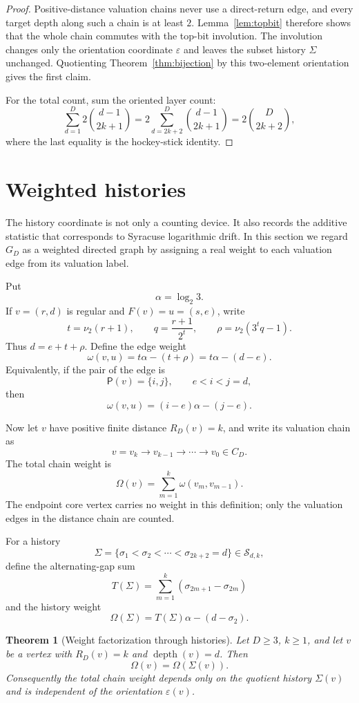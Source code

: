 \documentclass[11pt]{amsart}
\newtheorem{theorem}{Theorem}[section]
\theoremstyle{definition}
\theoremstyle{remark}
\newcommand{\nuu}{\nu_2}
\newcommand{\depth}{\operatorname{depth}}
\newcommand{\Pair}{\mathsf P}
\newcommand{\Sfam}{\mathcal S}
\newcommand{\eps}{\varepsilon}
\begin{document}
\begin{proof}
Positive-distance valuation chains never use a direct-return edge, and every target depth along such a chain is at least $2$.  Lemma~\ref{lem:topbit} therefore shows that the whole chain commutes with the top-bit involution.  The involution changes only the orientation coordinate $\eps$ and leaves the subset history $\Sigma$ unchanged.  Quotienting Theorem~\ref{thm:bijection} by this two-element orientation gives the first claim.

For the total count, sum the oriented layer count:
\[
\sum_{d=1}^D2\binom{d-1}{2k+1}
=
2\sum_{d=2k+2}^D\binom{d-1}{2k+1}
=
2\binom{D}{2k+2},
\]
where the last equality is the hockey-stick identity.
\end{proof}

\section{Weighted histories}\label{sec:weighted}

The history coordinate is not only a counting device.  It also records the additive statistic that corresponds to Syracuse logarithmic drift.  In this section we regard $G_D$ as a weighted directed graph by assigning a real weight to each valuation edge from its valuation label.

Put
\[
\alpha=\log_2 3.
\]
If $v=(r,d)$ is regular and $F(v)=u=(s,e)$, write
\[
t=\nuu(r+1),\qquad q=\frac{r+1}{2^t},\qquad \rho=\nuu(3^tq-1).
\]
Thus $d=e+t+\rho$.  Define the edge weight
\[
\omega(v,u)=t\alpha-(t+\rho)=t\alpha-(d-e).
\]
Equivalently, if the pair of the edge is
\[
\Pair(v)=\{i,j\},\qquad e<i<j=d,
\]
then
\[
\omega(v,u)=(i-e)\alpha-(j-e).
\]

Now let $v$ have positive finite distance $R_D(v)=k$, and write its valuation chain as
\[
v=v_k\to v_{k-1}\to\cdots\to v_0\in C_D.
\]
The total chain weight is
\[
\Omega(v)=\sum_{m=1}^k \omega(v_m,v_{m-1}).
\]
The endpoint core vertex carries no weight in this definition; only the valuation edges in the distance chain are counted.

For a history
\[
\Sigma=\{\sigma_1<\sigma_2<\cdots<\sigma_{2k+2}=d\}\in\Sfam_{d,k},
\]
define the alternating-gap sum
\[
T(\Sigma)=\sum_{m=1}^k(\sigma_{2m+1}-\sigma_{2m})
\]
and the history weight
\[
\Omega(\Sigma)=T(\Sigma)\alpha-(d-\sigma_2).
\]

\begin{theorem}[Weight factorization through histories]\label{thm:weightfactor}
Let $D\ge3$, $k\ge1$, and let $v$ be a vertex with $R_D(v)=k$ and $\depth(v)=d$.  Then
\[
\Omega(v)=\Omega(\Sigma(v)).
\]
Consequently the total chain weight depends only on the quotient history $\Sigma(v)$ and is independent of the orientation $\eps(v)$.
\end{theorem}
\end{document}
